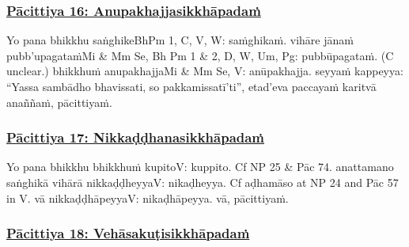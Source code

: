 \subsubsection*{\hyperref[exp16]{Pācittiya 16: Anupakhajjasikkhāpadaṁ}}
\label{pac16}

Yo pana bhikkhu saṅghike\makeatletter\hyperlink{endnote-appendix}\makeatother BhPm 1, C, V, W: saṁghikaṁ. vihāre jānaṁ pubb'upagataṁ\makeatletter\hyperlink{endnote-appendix}\makeatother Mi & Mm Se, Bh Pm 1 & 2, D, W, Um, Pg: pubbūpagataṁ. (C unclear.) bhikkhuṁ anupakhajja\makeatletter\hyperlink{endnote-appendix}\makeatother Mi & Mm Se, V: anūpakhajja. seyyaṁ kappeyya: ``Yassa sambādho bhavissati, so pakkamissatī'ti'', etad'eva paccayaṁ karitvā anaññaṁ, pācittiyaṁ.



\subsubsection*{\hyperref[exp17]{Pācittiya 17: Nikkaḍḍhanasikkhāpadaṁ}}
\label{pac17}

Yo pana bhikkhu bhikkhuṁ kupito\makeatletter\hyperlink{endnote-appendix}\makeatother V: kuppito. Cf NP 25 & Pāc 74. anattamano saṅghikā vihārā nikkaḍḍheyya\makeatletter\hyperlink{endnote-appendix}\makeatother V: nikaḍheyya. Cf aḍhamāso at NP 24 and Pāc 57 in V. vā nikkaḍḍhāpeyya\makeatletter\hyperlink{endnote-appendix}\makeatother V: nikaḍhāpeyya. vā, pācittiyaṁ.



\subsubsection*{\hyperref[exp18]{Pācittiya 18: Vehāsakuṭisikkhāpadaṁ}}
\label{pac18}

